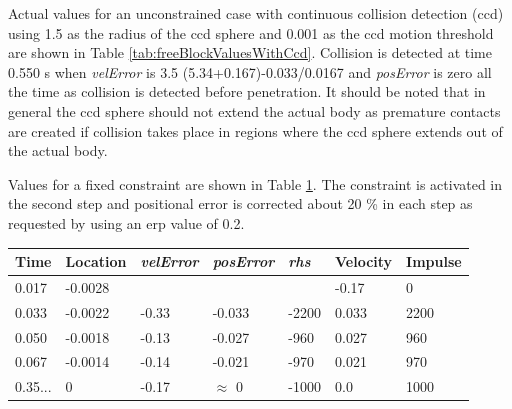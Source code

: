 Actual values for an unconstrained case with continuous collision detection (ccd) using 1.5 
as the radius of the ccd sphere and 0.001 as the ccd motion threshold
are shown in Table \ref{tab:freeBlockValuesWithCcd}. Collision is detected at time 0.550 s when
{\it velError} is  3.5 (5.34+0.167)-0.033/0.0167 and
{\it posError} is  zero all the time as collision is detected before penetration. 
It should be noted that in general the ccd sphere should not extend the actual body as 
premature contacts are created if collision takes place in regions where the ccd sphere extends out of the actual body.

\begin {table}
\end {table}

Values for a fixed constraint are shown in Table
\ref{tab:fixedBlockValues}. The constraint is activated in the second step and positional error is corrected
about 20 \% in each step as requested by using an erp value of 0.2.

\begin{table}
 {
\begin{tabular}{|l|l| l| l|l|l|l|}
\hline
{\bf Time} & 
{\bf Location} &
{\it velError} & {\it posError} & {\it rhs} &
{\bf Velocity} & 
{\bf Impulse} \\  \hline
0.017 & -0.0028 & & & 	 & -0.17 & 0 \\  \hline
0.033 & -0.0022 & -0.33 & -0.033 & -2200 & 0.033 & 2200 \\  \hline
0.050 & -0.0018 & -0.13 & -0.027 & -960 & 0.027 & 960 \\  \hline
0.067 & -0.0014 &-0.14 & -0.021 & -970 & 0.021 & 970 \\  \hline
0.35... & 0 &-0.17 & $\approx$ 0 & -1000 &0.0 & 1000 \\  \hline
\end {tabular}}
\label{tab:fixedBlockValues} 
\end {table}

